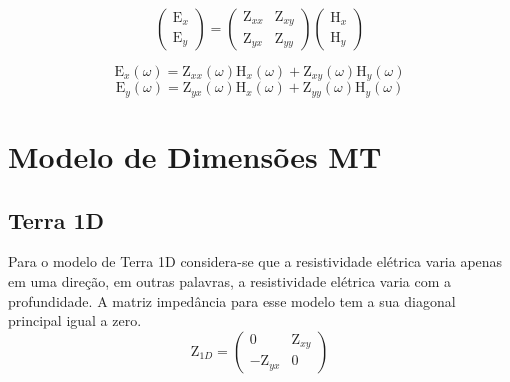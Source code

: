 	    
	    \begin{equation}
		\left (\begin{array}{c}
		 \textrm{E}_x\\
		 \textrm{E}_y
		\end{array}\right)
		=
		\left (\begin{array}{cc}
		 \textrm{Z}_{xx} & \textrm{Z}_{xy}\\
		 \textrm{Z}_{yx} & \textrm{Z}_{yy}
		\end{array}\right) \left (\begin{array}{c}
		 \textrm{H}_x\\
		 \textrm{H}_y
		\end{array}\right)
	    \end{equation}
	    
	    \begin{equation}
	    \label{Ex_Z}
	     \textrm{E}_x (\omega)=\textrm{Z}_{xx}(\omega) \textrm{H}_{x}(\omega) + \textrm{Z}_{xy}(\omega) \textrm{H}_{y}(\omega)
	    \end{equation}
	    \begin{equation}
	    \label{Ey_Z}
	     \textrm{E}_y (\omega)=\textrm{Z}_{yx}(\omega) \textrm{H}_{x}(\omega) + \textrm{Z}_{yy}(\omega) \textrm{H}_{y}(\omega)
	    \end{equation}  
    
    
    \section{Modelo de Dimensões MT}
    
        
        \subsection{Terra 1D}
        
        Para o modelo de Terra 1D considera-se que a resistividade elétrica varia apenas em uma direção, em outras palavras, a resistividade elétrica varia com a profundidade.        
        A matriz impedância para esse modelo tem a sua diagonal principal igual a zero.
        \begin{equation}
         \textrm{Z}_{1 D} = \left ( \begin{array}{cc}
                                     0 & \textrm{Z}_{xy} \\
                                    -\textrm{Z}_{yx} & 0
                                     \end{array}  \right)
        \end{equation}
        
